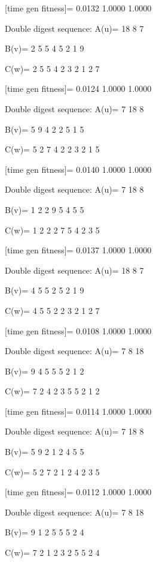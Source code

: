 [time gen fitness]=
    0.0132    1.0000    1.0000

Double digest sequence:
A(u)=
    18     8     7

B(v)=
     2     5     5     4     5     2     1     9

C(w)=
     2     5     5     4     2     3     2     1     2     7

[time gen fitness]=
    0.0124    1.0000    1.0000

Double digest sequence:
A(u)=
     7    18     8

B(v)=
     5     9     4     2     2     5     1     5

C(w)=
     5     2     7     4     2     2     3     2     1     5

[time gen fitness]=
    0.0140    1.0000    1.0000

Double digest sequence:
A(u)=
     7    18     8

B(v)=
     1     2     2     9     5     4     5     5

C(w)=
     1     2     2     2     7     5     4     2     3     5

[time gen fitness]=
    0.0137    1.0000    1.0000

Double digest sequence:
A(u)=
    18     8     7

B(v)=
     4     5     5     2     5     2     1     9

C(w)=
     4     5     5     2     2     3     2     1     2     7

[time gen fitness]=
    0.0108    1.0000    1.0000

Double digest sequence:
A(u)=
     7     8    18

B(v)=
     9     4     5     5     5     2     1     2

C(w)=
     7     2     4     2     3     5     5     2     1     2

[time gen fitness]=
    0.0114    1.0000    1.0000

Double digest sequence:
A(u)=
     7    18     8

B(v)=
     5     9     2     1     2     4     5     5

C(w)=
     5     2     7     2     1     2     4     2     3     5

[time gen fitness]=
    0.0112    1.0000    1.0000

Double digest sequence:
A(u)=
     7     8    18

B(v)=
     9     1     2     5     5     5     2     4

C(w)=
     7     2     1     2     3     2     5     5     2     4

